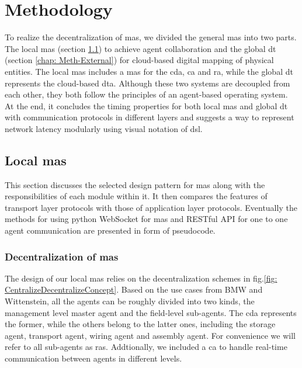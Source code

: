 \chapter{Methodology}\label{chap: Meth}%
To realize the decentralization of \gls{mas}, we divided the general \gls{mas} into 
two parts. The local \gls{mas} (section \ref{chap: Meth-Internal}) to achieve agent 
collaboration and the global \gls{dt} (section \ref{chap: Meth-External})
for cloud-based digital mapping of physical entities. The local \gls{mas} 
includes a \gls{mas} for the \gls{cda}, \gls{ca} and \gls{ra}, 
while the global \gls{dt} represents the cloud-based \gls{dta}. 
Although these two systems are decoupled from each other, 
they both follow the principles of an agent-based operating system. 
At the end, it concludes the timing properties for both 
local \gls{mas} and global \gls{dt} with communication protocols in 
different layers and suggests a way to represent 
network latency modularly using visual notation of \gls{dsl}. 




\section{Local \gls{mas}}\label{chap: Meth-Internal}%

This section discusses the selected design pattern for \gls{mas} along 
with the responsibilities of each module within it.
It then compares the features of transport layer protocols with those of 
application layer protocols.
Eventually the methods for using python WebSocket for \gls{mas} and 
RESTful API for one to one agent communication are presented in form of pseudocode. 


\subsection{Decentralization of \gls{mas}}
The design of our local \gls{mas} relies on the decentralization 
schemes in fig.\ref{fig: CentralizeDecentralizeConcept}. 
Based on the use cases from BMW and Wittenstein, all the agents can be roughly 
divided into two kinds, the management level master agent and the field-level sub-agents. 
The \gls{cda} represents the former, while the others belong to the latter ones, 
including the storage agent, transport agent, wiring agent and assembly agent. For 
convenience we will refer to all sub-agents as \gls{ras}. Addtionally, we included 
a \gls{ca} to handle real-time communication between agents in different levels. 


